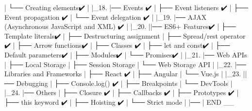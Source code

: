 | └── Creating elements✔️
|
|_18. 
|── Events ✔️
| ├── Event listeners ✔️
| ├── Event propagation ✔️
| └── Event delegation ✔️
|
|_19.
|── AJAX (Asynchronous JavaScript and XML) ✔️
|
|_20.
||── ES6+ Features✔️
| ├── Template literals✔️
| ├── Destructuring assignment
| ├── Spread/rest operator ✔️
| ├── Arrow functions✔️
| ├── Classes ✔️
| ├── let and const✔️
| ├── Default parameters✔️
| ├── Modules✔️
| └── Promises✔️
|
|_21.
|── Web APIs
| ├── Local Storage
| ├── Session Storage
| └── Web Storage API
|
|_22.
|── Libraries and Frameworks
| ├── React ✔️
| ├── Angular
| └── Vue.js
|
|_23.
||── Debugging
| ├── Console.log() ✔️
| ├── Breakpoints
| └── DevTools
|
|_24.
|── Others
| ├── Closure ✔️
| ├── Callbacks ✔️
| ├── Prototypes ✔️
| ├── this keyword ✔️
| ├── Hoisting ✔️
| └── Strict mode
|
|── 
| END __ 